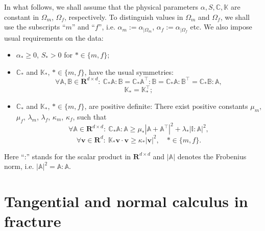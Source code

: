 \documentclass[a4paper]{article}
\def\CC{\tn C}
\def\Real{{\mathbf R}}
\def\tn#1{{\mathbb{#1}}}    %
\def\vc#1{\mathbf{\boldsymbol{#1}}}     %
\def\vv{\vc v}
\newcommand{\eq}[1]{\begin{equation}#1\end{equation}}
\newcommand{\eqs}[1]{\begin{equation*}#1\end{equation*}}
\begin{document}
In what follows, we shall assume that the physical parameters $\alpha,S,\CC,\tn K$ are constant in $\Omega_m$, $\Omega_f$, respectively.
To distinguish values in $\Omega_m$ and $\Omega_f$, we shall use the subscripts ``$m$'' and ``$f$'', i.e. $\alpha_m := \alpha_{|\Omega_m}$, $\alpha_f := \alpha_{|\Omega_f}$ etc.
We also impose usual requirements on the data:
\begin{itemize}
\item $\alpha_*\ge 0$, $S_*>0$ for $*\in\{m,f\}$;
\item $\CC_*$ and $\tn K_*$, $*\in\{m,f\}$, have the usual symmetries:
\eqs{ \forall \tn A,\tn B\in\Real^{d\times d}:~ \CC_*\tn A:\tn B=\CC_*\tn A^\top:\tn B=\CC_*\tn A:\tn B^\top=\CC_*\tn B:\tn A, }
\eqs{ \tn K_* = \tn K_*^\top; }
\item $\CC_*$ and $\tn K_*$, $*\in\{m,f\}$, are positive definite: %
There exist positive constants $\mu_m$, $\mu_f$, $\lambda_m$, $\lambda_f$, $\kappa_m$, $\kappa_f$, such that
\eq{ \label{eq:pos_def_C_gen} \forall\tn A\in\Real^{d\times d}:~\CC_*\tn A:\tn A \ge \mu_*\left|\tn A+\tn A^\top\right|^2 + \lambda_*|\tn I:\tn A|^2, }
\eq{ \label{eq:pos_def_K} \forall\vv\in\Real^d:~\tn K_*\vv\cdot\vv \ge \kappa_*|\vv|^2,\quad *\in\{m,f\}. }
\end{itemize}
Here ``:'' stands for the scalar product in $\Real^{d\times d}$ and $|\tn A|$ denotes the Frobenius norm, i.e. $|\tn A|^2=\tn A:\tn A$.




\section{Tangential and normal calculus in fracture}\label{sec:calculus}
\end{document}
